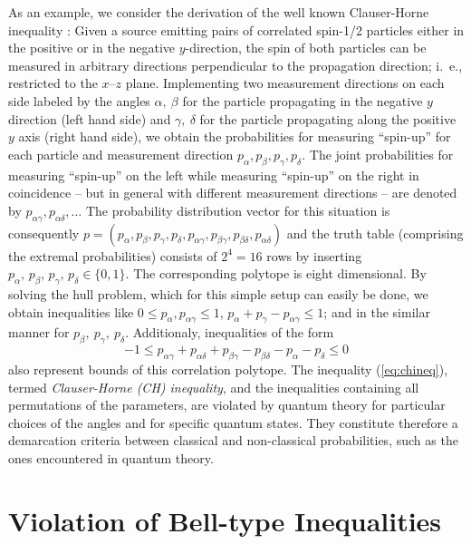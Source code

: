 \documentclass[pra,amsmath,amsfonts,showkeys,showpacs,preprint]{revtex4}
\begin{document}
As an example, we consider the derivation of the well known
Clauser-Horne inequality \cite{clauser74}: Given a source emitting pairs of correlated
spin-1/2 particles either in the positive or in the negative $y$-direction,
the spin of both particles can be measured in arbitrary directions  perpendicular to the
propagation direction;
 i.~e., restricted to the $x$--$z$ plane.
Implementing two measurement directions on each
side labeled by the angles $\alpha,\ \beta$ for the particle
propagating in the negative $y$ direction (left hand side) and
$\gamma,\ \delta$ for the particle propagating along the positive
$y$ axis (right hand side), we
obtain the probabilities for measuring ``spin-up'' for each particle
and measurement direction $p_\alpha, p_\beta, p_\gamma, p_\delta$. The
joint probabilities for measuring ``spin-up'' on the left while
measuring ``spin-up'' on the right in coincidence -- but in general with different measurement
directions -- are denoted by $p_{\alpha\gamma},p_{\alpha\delta},\ldots$
The probability distribution vector for this situation is consequently
$p=(p_\alpha,
p_\beta,p_\gamma,p_\delta,p_{\alpha\gamma},p_{\beta\gamma},p_{\beta\delta},p_{\alpha\delta})$
and the truth table (comprising the extremal probabilities) consists of
$2^4=16$ rows by inserting $p_\alpha,\,p_\beta,\,p_\gamma,\,p_\delta \in \{0,1\}$.
The corresponding polytope is eight dimensional.
By solving the hull problem, which for this simple
setup can easily be done,
we obtain inequalities like $0 \leq
p_\alpha,p_{\alpha\gamma}\leq 1$, $p_\alpha + p_\gamma -
p_{\alpha\gamma} \leq 1$; and in the similar manner for $p_\beta,\
p_\gamma,\ p_\delta$. Additionaly, inequalities of the form
\begin{equation}
  \label{eq:chineq}
    -1\leq p_{\alpha\gamma} + p_{\alpha\delta} + p_{\beta\gamma} - p_{\beta\delta} - p_{\alpha} - p_{\delta} \leq 0
\end{equation}
also represent bounds of this correlation polytope.
The inequality (\ref{eq:chineq}),
termed \emph{Clauser-Horne (CH) inequality}, and the inequalities containing all permutations of the parameters,
are violated by quantum theory
for particular choices of the angles and for specific quantum states.
They constitute therefore a demarcation
criteria between classical and non-classical probabilities, such as the ones encountered in quantum theory.

\section{Violation of Bell-type Inequalities}
\end{document}
